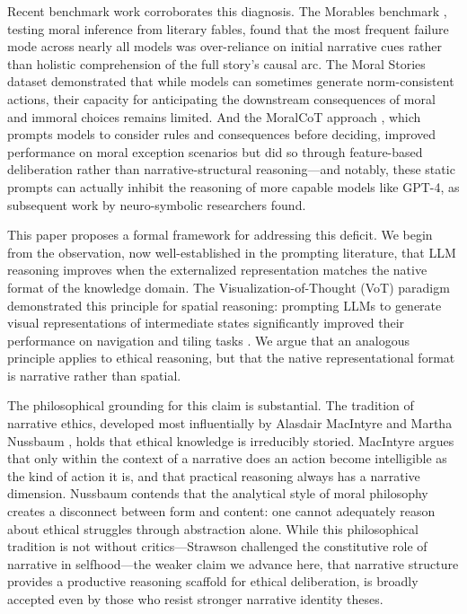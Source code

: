 \documentclass[11pt,letterpaper]{article}
\theoremstyle{defn}
\begin{document}
Recent benchmark work corroborates this diagnosis. The Morables benchmark \citep{morables2025}, testing moral inference from literary fables, found that the most frequent failure mode across nearly all models was over-reliance on initial narrative cues rather than holistic comprehension of the full story's causal arc. The Moral Stories dataset \citep{emelin2021moral} demonstrated that while models can sometimes generate norm-consistent actions, their capacity for anticipating the downstream consequences of moral and immoral choices remains limited. And the MoralCoT approach \citep{jin2022when}, which prompts models to consider rules and consequences before deciding, improved performance on moral exception scenarios but did so through feature-based deliberation rather than narrative-structural reasoning---and notably, these static prompts can actually inhibit the reasoning of more capable models like GPT-4, as subsequent work by neuro-symbolic researchers found.

This paper proposes a formal framework for addressing this deficit. We begin from the observation, now well-established in the prompting literature, that LLM reasoning improves when the externalized representation matches the native format of the knowledge domain. The Visualization-of-Thought (VoT) paradigm demonstrated this principle for spatial reasoning: prompting LLMs to generate visual representations of intermediate states significantly improved their performance on navigation and tiling tasks \citep{wu2024mindseye}. We argue that an analogous principle applies to ethical reasoning, but that the native representational format is narrative rather than spatial.

The philosophical grounding for this claim is substantial. The tradition of narrative ethics, developed most influentially by Alasdair MacIntyre \citeyearpar{macintyre1981,macintyre2016} and Martha Nussbaum \citeyearpar{nussbaum1990,nussbaum1997}, holds that ethical knowledge is irreducibly storied. MacIntyre argues that only within the context of a narrative does an action become intelligible as the kind of action it is, and that practical reasoning always has a narrative dimension. Nussbaum contends that the analytical style of moral philosophy creates a disconnect between form and content: one cannot adequately reason about ethical struggles through abstraction alone. While this philosophical tradition is not without critics---Strawson \citeyearpar{strawson2004} challenged the constitutive role of narrative in selfhood---the weaker claim we advance here, that narrative structure provides a productive reasoning scaffold for ethical deliberation, is broadly accepted even by those who resist stronger narrative identity theses.
\end{document}
